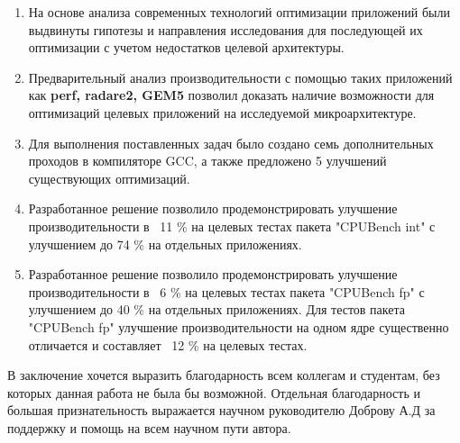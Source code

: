 \begin{enumerate}
	\item На основе анализа современных технологий оптимизации приложений были выдвинуты гипотезы и направления исследования для последующей их оптимизации с учетом недостатков целевой архитектуры.
	\item Предварительный анализ производительности с помощью таких приложений как \textbf{perf, radare2, GEM5} позволил доказать наличие возможности  для оптимизаций целевых приложений на исследуемой микроархитектуре. 
	\item Для выполнения поставленных задач было создано семь дополнительных проходов в компиляторе GCC, а также предложено 5 улучшений существующих оптимизаций.
	\item Разработанное решение позволило продемонстрировать улучшение производительности в ~11 \% на целевых тестах пакета "CPUBench int"\phantom{}  с улучшением до 74 \% на отдельных приложениях. 
	\item Разработанное решение позволило продемонстрировать улучшение производительности в ~6 \% на целевых тестах пакета "CPUBench fp"\phantom{}  с улучшением до 40 \% на отдельных приложениях. Для тестов пакета "CPUBench fp"\phantom{} улучшение производительности на  одном ядре существенно отличается и составляет ~12 \% на целевых тестах.
\end{enumerate}

В заключение хочется выразить благодарность всем коллегам и студентам, без которых данная работа не была бы возможной. Отдельная благодарность и большая признательность выражается научном руководителю Доброву А.Д за поддержку и помощь на всем научном пути автора.

